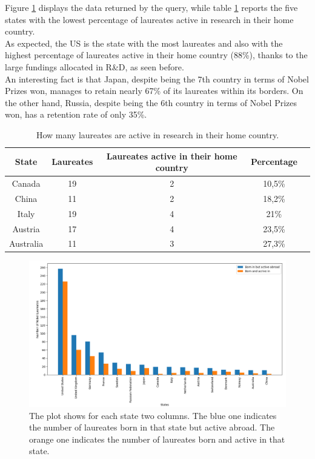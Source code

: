 \documentclass{article}
\begin{document}
\noindent Figure \ref{fig:laureatesComparison} displays the data returned by the query, while table \ref{tab:laureates_active} reports the five states with the lowest percentage
of laureates active in research in their home country.\\
As expected, the US is the state with the most laureates and also with the highest percentage
of laureates active in their home country (88\%), thanks to the large fundings allocated in R\&D, as seen before.\\
An interesting fact is that Japan, despite being the 7th country in terms of Nobel Prizes won, manages to retain nearly 67\% of its laureates
within its borders. On the other hand, Russia, despite being the 6th country in terms of Nobel Prizes won, has a retention rate of only 35\%.

\begin{table}[h!]
	\centering
	\begin{tabular}{|c|c|c|c|c|}
		\hline
		\textbf{State} & \textbf{Laureates} & \textbf{Laureates active in their home country} & \textbf{Percentage} \\ \hline
		Canada         & 19                 & 2                                               & 10,5\%              \\ \hline
		China          & 11                 & 2                                               & 18,2\%              \\ \hline
		Italy          & 19                 & 4                                               & 21\%                \\ \hline
		Austria        & 17                 & 4                                               & 23,5\%              \\ \hline
		Australia      & 11                 & 3                                               & 27,3\%              \\ \hline
	\end{tabular}
	\caption{How many laureates are active in research in their home country.}
	\label{tab:laureates_active}
\end{table}

\begin{figure}[H]
	\centering
	\includegraphics[width=\textwidth]{../queries/plots/laureatesComparison.png}
	\caption{The plot shows for each state two columns. The blue one indicates the number of laureates born in that state but active abroad.
		The orange one indicates the number of laureates born and active in that state.}
	\label{fig:laureatesComparison}
\end{figure}
\end{document}

